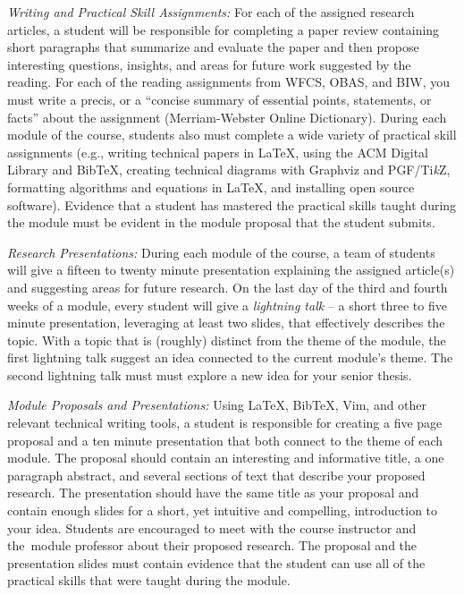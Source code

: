 \documentclass[11pt]{article} %
\begin{document}
\begin{itemize}
{\item {\em Writing and Practical Skill Assignments:} For each of the assigned research articles, a student will be responsible for completing a paper review containing short paragraphs that summarize and evaluate the paper and then propose interesting questions, insights, and areas for future work suggested by the reading. For each of the reading assignments from WFCS, OBAS, and BIW, you must write a precis, or a ``concise summary of essential points, statements, or facts'' about the assignment (Merriam-Webster Online Dictionary). During each module of the course, students also must complete a wide variety of practical skill assignments (e.g., writing technical papers in LaTeX, using the ACM Digital Library and BibTeX, creating technical diagrams with Graphviz and PGF/Ti\emph{k}Z, formatting algorithms and equations in LaTeX, and installing open source software). Evidence that a student has mastered the practical skills taught during the module must be evident in the module proposal that the student submits.

\item {\em Research Presentations:} During each module of the course, a team of students will give a fifteen to twenty minute presentation explaining the assigned article(s) and suggesting areas for future research. On the last day of the third and fourth weeks of a module, every student will give a \emph{lightning talk} -- a short three to five minute presentation, leveraging at least two slides, that effectively describes the topic. With a topic that is (roughly) distinct from the theme of the module, the first lightning talk suggest an idea connected to the current module's theme. The second lightning talk must must explore a new idea for your senior thesis.


\item {\em Module Proposals and Presentations:} Using \LaTeX, BibTeX, Vim, and other relevant technical writing tools, a student is responsible for creating a five page proposal and a ten minute presentation that both connect to the theme of each module. The proposal should contain an interesting and informative title, a one paragraph abstract, and several sections of text that describe your proposed research. The presentation should have the same title as your proposal and contain enough slides for a short, yet intuitive and compelling, introduction to your idea.  Students are encouraged to meet with the course instructor and \mbox{the module} professor about their proposed research. The proposal and the presentation slides must contain evidence that the student can use all of the practical skills that were taught during the module.  %
}

\end{itemize}
\end{document}
